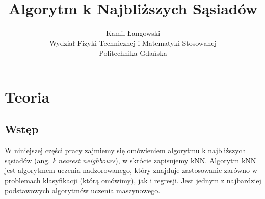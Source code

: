 \documentclass[a4paper]{article}
\title{Algorytm k Najbliższych Sąsiadów}
\author{Kamil Łangowski \\ Wydział Fizyki Technicznej i Matematyki Stosowanej \\ Politechnika Gdańska}
\begin{document}
\maketitle
\newpage
\section{Teoria}
\subsection{Wstęp}
W niniejszej części pracy zajmiemy się omówieniem algorytmu k najbliższych sąsiadów (ang. \textit{k nearest neighbours}), w skrócie zapisujemy kNN. Algorytm kNN jest algorytmem uczenia nadzorowanego, który znajduje zastosowanie zarówno w problemach klasyfikacji (którą omówimy), jak i regresji. Jest jednym z najbardziej podstawowych algorytmów uczenia maszynowego.
\end{document}
